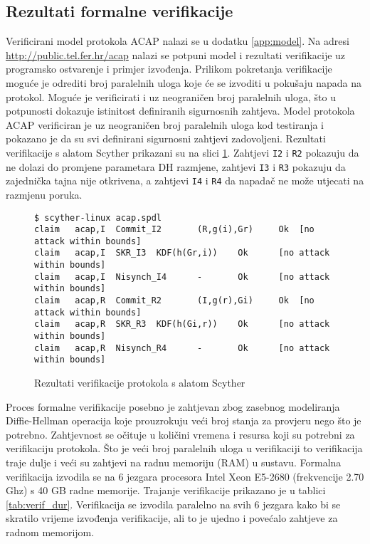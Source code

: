 \subsection{Rezultati formalne verifikacije}

Verificirani model protokola ACAP nalazi se u dodatku \ref{app:model}.
Na adresi \url{http://public.tel.fer.hr/acap} nalazi se potpuni model i
rezultati verifikacije uz programsko ostvarenje i primjer izvođenja.
Prilikom pokretanja
verifikacije moguće je odrediti broj paralelnih uloga koje će se izvoditi u
pokušaju napada na protokol. Moguće je verificirati i uz neograničen broj
paralelnih uloga, što u potpunosti dokazuje istinitost definiranih sigurnosnih
zahtjeva. Model protokola ACAP verificiran je uz neograničen broj paralelnih
uloga kod testiranja i pokazano je da su svi definirani sigurnosni zahtjevi
zadovoljeni.  
Rezultati verifikacije s alatom Scyther prikazani su na slici
\ref{fig:verif_res}.
Zahtjevi \texttt{I2} i \texttt{R2} pokazuju da ne dolazi do promjene parametara
DH razmjene,
zahtjevi \texttt{I3} i \texttt{R3} pokazuju da zajednička tajna nije otkrivena,
a zahtjevi \texttt{I4} i \texttt{R4} da napadač ne može utjecati na razmjenu
poruka.

\begin{figure}[ht]
\begin{centering}
\begin{framed}
\begin{small}
\begin{verbatim}
$ scyther-linux acap.spdl
claim   acap,I  Commit_I2       (R,g(i),Gr)     Ok  [no attack within bounds]
claim   acap,I  SKR_I3  KDF(h(Gr,i))    Ok      [no attack within bounds]
claim   acap,I  Nisynch_I4      -       Ok      [no attack within bounds]
claim   acap,R  Commit_R2       (I,g(r),Gi)     Ok  [no attack within bounds]
claim   acap,R  SKR_R3  KDF(h(Gi,r))    Ok      [no attack within bounds]
claim   acap,R  Nisynch_R4      -       Ok      [no attack within bounds]
\end{verbatim}
\end{small}
\vspace{-15pt}
\end{framed}
\vspace{-15pt}
\caption{Rezultati verifikacije protokola s alatom Scyther}
\label{fig:verif_res}
\end{centering}
\end{figure}
\vspace{-10pt}

Proces formalne verifikacije posebno je zahtjevan zbog zasebnog modeliranja
Diffie-Hellman operacija koje prouzrokuju veći broj stanja za provjeru nego što
je potrebno. Zahtjevnost se očituje u količini vremena i resursa koji su
potrebni za verifikaciju protokola. Što je veći broj paralelnih uloga u
verifikaciji to verifikacija traje dulje i veći su zahtjevi na radnu memoriju
(RAM) u sustavu.
Formalna verifikacija izvodila se na 6 jezgara procesora Intel Xeon E5-2680
(frekvencije 2.70 Ghz) s 40 GB radne memorije. Trajanje verifikacije
prikazano je u tablici \ref{tab:verif_dur}. Verifikacija se izvodila paralelno
na svih 6 jezgara kako bi se skratilo vrijeme izvođenja verifikacije, ali to je
ujedno i povećalo zahtjeve za radnom memorijom.

